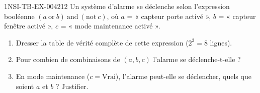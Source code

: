 \begin{exercice}{1NSI-TB-EX-004}{2}{12}
Un système d'alarme se déclenche selon l'expression booléenne
$(a\ \text{or}\ b)\ \text{and}\ (\text{not}\ c)$, où $a$ = « capteur porte activé »,
$b$ = « capteur fenêtre activé », $c$ = « mode maintenance activé ».
\begin{enumerate}
  \item Dresser la table de vérité complète de cette expression ($2^3=8$ lignes).
  \item Pour combien de combinaisons de $(a,b,c)$ l'alarme se déclenche-t-elle ?
  \item En mode maintenance ($c=\text{Vrai}$), l'alarme peut-elle se déclencher, quels que soient $a$ et $b$ ? Justifier.
\end{enumerate}
\end{exercice}
